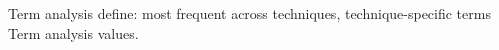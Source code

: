 Term analysis define: most frequent across techniques, technique-specific terms
Term analysis values.











